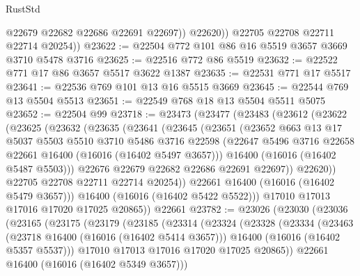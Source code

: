 \begin{lexlean}{RustStd}
\begin{coremodule}
                @22679
                @22682
                @22686
                @22691
                @22697))
            @22620))
        @22705
        @22708
        @22711
        @22714
        @20254))
@23622 := @22504 @772 @101 @86 @16 @5519 @3657 @3669 @3710 @5478 @3716
@23625 := @22516 @772 @86 @5519
@23632 := @22522 @771 @17 @86 @3657 @5517 @3622 @1387
@23635 := @22531 @771 @17 @5517
@23641 := @22536 @769 @101 @13 @16 @5515 @3669
@23645 := @22544 @769 @13 @5504 @5513
@23651 := @22549 @768 @18 @13 @5504 @5511 @5075
@23652 := @22504 @99
@23718 := @23473
    (@23477
      (@23483
        (@23612
          (@23622
            (@23625
              (@23632
                (@23635
                  (@23641
                    (@23645
                      (@23651
                        (@23652
                          @663
                          @13
                          @17
                          @5037
                          @5503
                          @5510
                          @3710
                          @5486
                          @3716
                          @22598
                          (@22647 @5496 @3716 @22658 @22661 @16400 (@16016 (@16402 @5497 @3657)))
                          @16400
                          (@16016 (@16402 @5487 @5503)))
                        @22676
                        @22679
                        @22682
                        @22686
                        @22691
                        @22697))
                    @22620))
                @22705
                @22708
                @22711
                @22714
                @20254))
            @22661
            @16400
            (@16016 (@16402 @5479 @3657)))
          @16400
          (@16016 (@16402 @5422 @5522)))
        @17010
        @17013
        @17016
        @17020
        @17025
        @20865))
    @22661
@23782 := @23026
    (@23030
      (@23036
        (@23165
          (@23175
            (@23179
              (@23185
                (@23314
                  (@23324
                    (@23328
                      (@23334
                        (@23463
                          (@23718 @16400 (@16016 (@16402 @5414 @3657)))
                          @16400
                          (@16016 (@16402 @5357 @5537)))
                        @17010
                        @17013
                        @17016
                        @17020
                        @17025
                        @20865))
                    @22661
                    @16400
                    (@16016 (@16402 @5349 @3657)))

\end{coremodule}
\end{lexlean}
